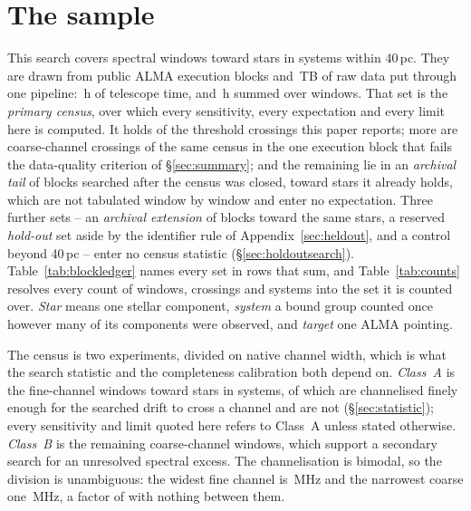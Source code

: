 \section{The sample}
\label{sec:sample}

This search covers \NWindows{} spectral windows toward \NStars{} stars in
\NSystems{} systems within 40\,pc. They are drawn from \NEB{} public ALMA
execution blocks and \TotalDataTB\,TB of raw data put through one pipeline:
\StTelHours\,h of telescope time, and \LdgCensusHours\,h summed over
windows. That set is the \emph{primary census}, over which every sensitivity,
every expectation and every limit here is computed. It holds \MtCrossACen{} of
the \EvNCrossRaw{} threshold crossings this paper reports; \LdgNCrossB{} more
are coarse-channel crossings of the same census in the one execution block
that fails the data-quality criterion of \S\ref{sec:summary}; and the
remaining \CeNTailCross{} lie in an \emph{archival tail} of blocks searched
after the census was closed, toward stars it already holds, which are not
tabulated window by window and enter no expectation. Three further sets -- an
\emph{archival extension} of blocks toward the same stars, a reserved
\emph{hold-out} set aside by the identifier rule of
Appendix~\ref{sec:heldout}, and a control beyond 40\,pc -- enter no census
statistic (\S\ref{sec:holdoutsearch}). Table~\ref{tab:blockledger} names
every set in rows that sum, and Table~\ref{tab:counts} resolves every count
of windows, crossings and systems into the set it is counted over.
\emph{Star} means one stellar component, \emph{system} a bound group
counted once however many of its components were observed, and \emph{target}
one ALMA pointing.

The census is two experiments, divided on native channel width, which is what
the search statistic and the completeness calibration both depend on.
\emph{Class~A} is the \NWinA{} fine-channel windows toward \LdgClassAStars{}
stars in \NSysClassA{} systems, of which \EtaDriftAOk{} are channelised finely
enough for the searched drift to cross a channel and \EtaDriftALo{} are not
(\S\ref{sec:statistic}); every sensitivity and limit quoted here refers to
Class~A unless stated otherwise. \emph{Class~B} is the remaining \NWinB{}
coarse-channel windows, which support a secondary search for an unresolved
spectral excess. The channelisation is bimodal, so the division is
unambiguous: the widest fine channel is \ScChanFineMaxMHz\,MHz and the
narrowest coarse one \ScChanCoarseMinMHz\,MHz, a factor of \ScChanGapFac{}
with nothing between them.

